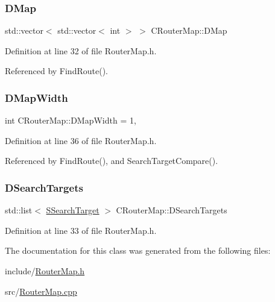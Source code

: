 \hypertarget{classCRouterMap_a313fe70c998e9e3f22753d47075af1a6}{}\label{classCRouterMap_a313fe70c998e9e3f22753d47075af1a6} 
\subsubsection{\texorpdfstring{D\+Map}{DMap}}
{\footnotesize\ttfamily std\+::vector$<$ std\+::vector$<$ int $>$ $>$ C\+Router\+Map\+::\+D\+Map\hspace{0.3cm}{\ttfamily [protected]}}



Definition at line 32 of file Router\+Map.\+h.



Referenced by Find\+Route().

\hypertarget{classCRouterMap_a9899b7a017d376a16af153f6f91159d3}{}\label{classCRouterMap_a9899b7a017d376a16af153f6f91159d3} 
\subsubsection{\texorpdfstring{D\+Map\+Width}{DMapWidth}}
{\footnotesize\ttfamily int C\+Router\+Map\+::\+D\+Map\+Width = 1\hspace{0.3cm}{\ttfamily [static]}, {\ttfamily [protected]}}



Definition at line 36 of file Router\+Map.\+h.



Referenced by Find\+Route(), and Search\+Target\+Compare().

\hypertarget{classCRouterMap_a903a8d0891e61b169e6aa72da27d62ba}{}\label{classCRouterMap_a903a8d0891e61b169e6aa72da27d62ba} 
\subsubsection{\texorpdfstring{D\+Search\+Targets}{DSearchTargets}}
{\footnotesize\ttfamily std\+::list$<$ \hyperlink{structCRouterMap_1_1SSearchTarget}{S\+Search\+Target} $>$ C\+Router\+Map\+::\+D\+Search\+Targets\hspace{0.3cm}{\ttfamily [protected]}}



Definition at line 33 of file Router\+Map.\+h.



The documentation for this class was generated from the following files\+:\begin{DoxyCompactItemize}
\item 
include/\hyperlink{RouterMap_8h}{Router\+Map.\+h}\item 
src/\hyperlink{RouterMap_8cpp}{Router\+Map.\+cpp}\end{DoxyCompactItemize}
